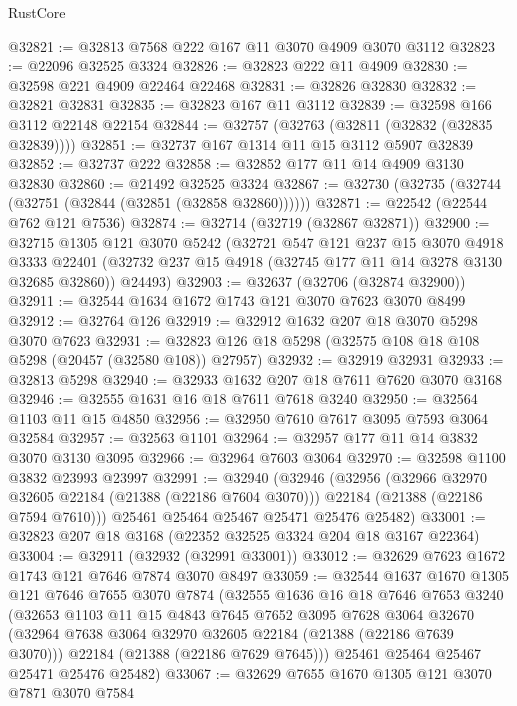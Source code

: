\begin{lexlean}{RustCore}
\begin{coremodule}
@32821 := @32813 @7568 @222 @167 @11 @3070 @4909 @3070 @3112
@32823 := @22096 @32525 @3324
@32826 := @32823 @222 @11 @4909
@32830 := @32598 @221 @4909 @22464 @22468
@32831 := @32826 @32830
@32832 := @32821 @32831
@32835 := @32823 @167 @11 @3112
@32839 := @32598 @166 @3112 @22148 @22154
@32844 := @32757 (@32763 (@32811 (@32832 (@32835 @32839))))
@32851 := @32737 @167 @1314 @11 @15 @3112 @5907 @32839
@32852 := @32737 @222
@32858 := @32852 @177 @11 @14 @4909 @3130 @32830
@32860 := @21492 @32525 @3324
@32867 := @32730 (@32735 (@32744 (@32751 (@32844 (@32851 (@32858 @32860))))))
@32871 := @22542 (@22544 @762 @121 @7536)
@32874 := @32714 (@32719 (@32867 @32871))
@32900 := @32715
    @1305
    @121
    @3070
    @5242
    (@32721
      @547
      @121
      @237
      @15
      @3070
      @4918
      @3333
      @22401
      (@32732 @237 @15 @4918 (@32745 @177 @11 @14 @3278 @3130 @32685 @32860))
      @24493)
@32903 := @32637 (@32706 (@32874 @32900))
@32911 := @32544 @1634 @1672 @1743 @121 @3070 @7623 @3070 @8499
@32912 := @32764 @126
@32919 := @32912 @1632 @207 @18 @3070 @5298 @3070 @7623
@32931 := @32823 @126 @18 @5298 (@32575 @108 @18 @108 @5298 (@20457 (@32580 @108)) @27957)
@32932 := @32919 @32931
@32933 := @32813 @5298
@32940 := @32933 @1632 @207 @18 @7611 @7620 @3070 @3168
@32946 := @32555 @1631 @16 @18 @7611 @7618 @3240
@32950 := @32564 @1103 @11 @15 @4850
@32956 := @32950 @7610 @7617 @3095 @7593 @3064 @32584
@32957 := @32563 @1101
@32964 := @32957 @177 @11 @14 @3832 @3070 @3130 @3095
@32966 := @32964 @7603 @3064
@32970 := @32598 @1100 @3832 @23993 @23997
@32991 := @32940
    (@32946
      (@32956
        (@32966 @32970 @32605 @22184 (@21388 (@22186 @7604 @3070)))
        @22184
        (@21388 (@22186 @7594 @7610)))
      @25461
      @25464
      @25467
      @25471
      @25476
      @25482)
@33001 := @32823 @207 @18 @3168 (@22352 @32525 @3324 @204 @18 @3167 @22364)
@33004 := @32911 (@32932 (@32991 @33001))
@33012 := @32629 @7623 @1672 @1743 @121 @7646 @7874 @3070 @8497
@33059 := @32544
    @1637
    @1670
    @1305
    @121
    @7646
    @7655
    @3070
    @7874
    (@32555
      @1636
      @16
      @18
      @7646
      @7653
      @3240
      (@32653
        @1103
        @11
        @15
        @4843
        @7645
        @7652
        @3095
        @7628
        @3064
        @32670
        (@32964 @7638 @3064 @32970 @32605 @22184 (@21388 (@22186 @7639 @3070)))
        @22184
        (@21388 (@22186 @7629 @7645)))
      @25461
      @25464
      @25467
      @25471
      @25476
      @25482)
@33067 := @32629 @7655 @1670 @1305 @121 @3070 @7871 @3070 @7584

\end{coremodule}
\end{lexlean}
